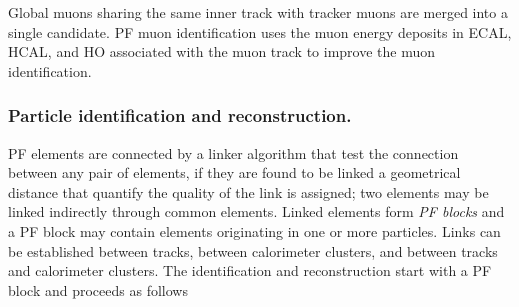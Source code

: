 \noindent Global muons sharing the same inner track with tracker muons are merged into a single candidate. PF muon identification uses the muon energy deposits in ECAL, HCAL, and HO associated with the muon track to improve the muon identification.

\subsubsection{Particle identification and reconstruction.}

\noindent PF elements are connected by a linker algorithm that test the connection between any pair of elements, if they are found to be linked a geometrical distance that quantify the quality of the link is assigned; two elements may be linked indirectly through common elements. Linked elements form \textit{PF blocks} and a PF block may contain elements originating in one or more particles. Links can be established between tracks, between calorimeter clusters, and between tracks and calorimeter clusters. The identification and reconstruction start with a PF block and proceeds as follows     

